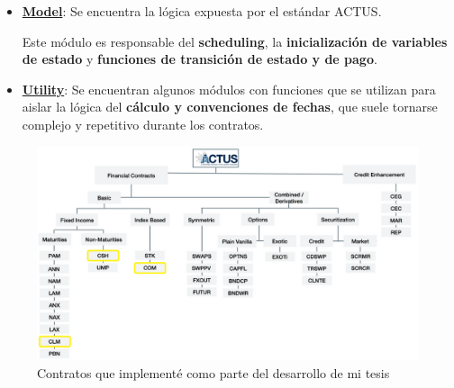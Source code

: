 \documentclass{beamer}
\newcommand{\nologo}{\setbeamertemplate{logo}{}} %
\begin{document}
\begin{frame}
    \begin{itemize}
        \item \textbf{\underline{Model}}: Se encuentra la lógica expuesta por el estándar ACTUS. 

            \medskip

            Este módulo es responsable del \textbf{scheduling}, la \textbf{inicialización de variables de estado} y \textbf{funciones de transición de estado y de pago}.

            \vfill
            \pause

        \item \textbf{\underline{Utility}}: Se encuentran algunos módulos con funciones que se utilizan para aislar la lógica del \textbf{cálculo y convenciones de fechas}, que suele tornarse complejo y repetitivo durante los contratos.
    \end{itemize}
\end{frame}

{\nologo
\begin{frame}[fragile]
\begin{figure}[H]
    \centering
    \includegraphics[width=\textwidth]{ACTUS_Taxonomy_hl.png}
    \caption{Contratos que implementé como parte del desarrollo de mi tesis}
\end{figure}

\end{frame}
}
\end{document}
